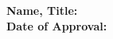 \begin{center}
\begin{tabbing}
    \textbf{Name, Title:} \>  \> \underline{\hspace{4cm}}
    \\
    \textbf{Date of Approval:} \>  \> \underline{\hspace{4cm}}\\
\end{tabbing}

\end{center}

